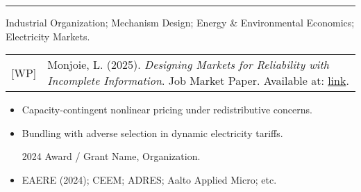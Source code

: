 \vspace{0.6em}\hrule\vspace{0.8em}


Industrial Organization; Mechanism Design; Energy & Environmental Economics; Electricity Markets.






\begin{longtable}{@{}p{1cm}p{14cm}@{}}
[WP] & Monjoie, L. (2025). \emph{Designing Markets for Reliability with Incomplete Information}. Job Market Paper. Available at: \href{https://leopoldmonjoie.com/files/monjoie_jmp.pdf}{link}. \\
\end{longtable}


\begin{itemize}
\item Capacity-contingent nonlinear pricing under redistributive concerns.
\item Bundling with adverse selection in dynamic electricity tariffs.
\end{itemize}


\begin{itemize}
\item [2024] Award / Grant Name, Organization.
\end{itemize}


\begin{itemize}
\item EAERE (2024); CEEM; ADRES; Aalto Applied Micro; etc.
\end{itemize}


